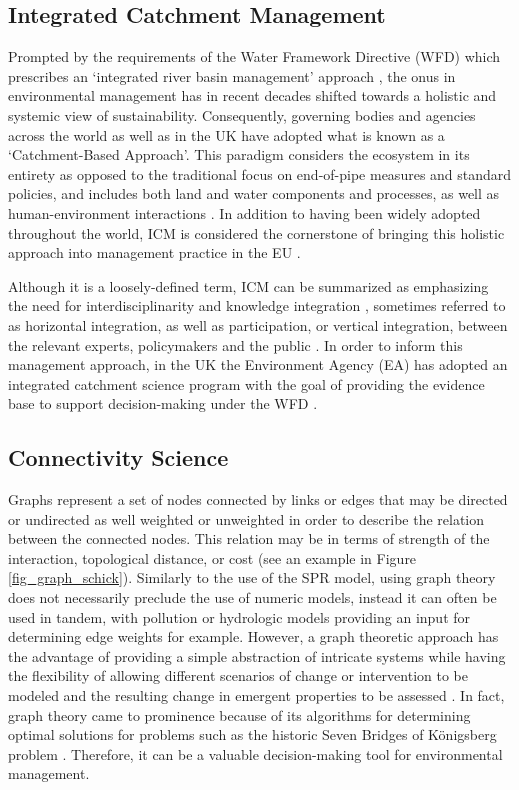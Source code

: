 \documentclass{article}
\begin{document}
\subsection{Integrated Catchment Management}
Prompted by the requirements of the Water Framework Directive (WFD) which prescribes an ‘integrated river basin management’ approach \citep{EuropeanCommission2000DIRECTIVEPolicy}, the onus in environmental management has in recent decades shifted towards a holistic and systemic view of sustainability. Consequently, governing bodies and agencies across the world as well as in the UK have adopted what is known as a ‘Catchment-Based Approach’\citep{DEFRA2013CatchmentEnvironment}. This paradigm considers the ecosystem in its entirety as opposed to the traditional focus on end-of-pipe measures and standard policies, and includes both land and water components and processes, as well as human-environment interactions \citep{Voulvoulis2016TheImplementation}. In addition to having been widely adopted throughout the world, ICM is considered the cornerstone of bringing this holistic approach into management practice in the EU \citep{Collins2010TrustingWales}. 

Although it is a loosely-defined term, ICM can be summarized as emphasizing the need for interdisciplinarity and knowledge integration \citep{Voulvoulis2012WaterApproach}, sometimes referred to as horizontal integration, as well as participation, or vertical integration, between the relevant experts, policymakers and the public \citep{Rollason2018EvaluatingManagement}. In order to inform this management approach, in the UK the Environment Agency (EA) has adopted an integrated catchment science program with the goal of providing the evidence base to support decision-making under the WFD \citep{Collins2010TrustingWales}.

\subsection{Connectivity Science}
Graphs represent a set of nodes connected by links or edges that may be directed or undirected as well weighted or unweighted in order to describe the relation between the connected nodes. This relation may be in terms of strength of the interaction, topological distance, or cost (see an example in Figure \ref{fig_graph_schick}). Similarly to the use of the SPR model, using graph theory does not necessarily preclude the use of numeric models, instead it can often be used in tandem, with pollution or hydrologic models providing an input for determining edge weights for example. However, a graph theoretic approach has the advantage of providing a simple abstraction of intricate systems while having the flexibility of allowing different scenarios of change or intervention to be modeled and the resulting change in emergent properties to be assessed \citep{OHanley2005OptimizingBarriers}. In fact, graph theory came to prominence because of its algorithms for determining optimal solutions for problems such as the historic Seven Bridges of Königsberg problem \citep{Bullmore2009ComplexSystems}. Therefore, it can be a valuable decision-making tool for environmental management.
\end{document}
